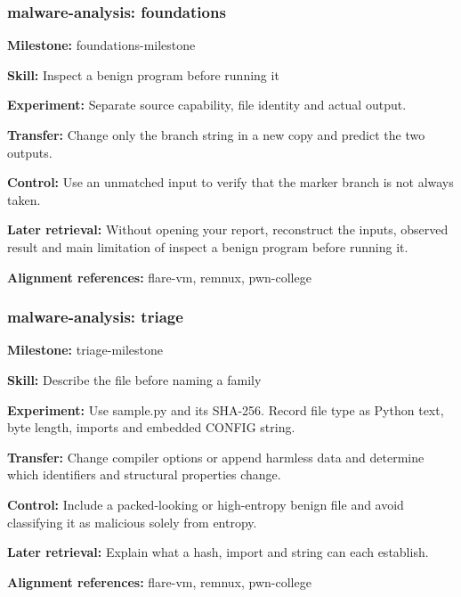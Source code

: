 \subsubsection{malware-analysis: foundations}
\noindent\textbf{Milestone:} foundations-milestone\par
\noindent\textbf{Skill:} Inspect a benign program before running it\par
\noindent\textbf{Experiment:} Separate source capability, file identity and actual output.\par
\noindent\textbf{Transfer:} Change only the branch string in a new copy and predict the two outputs.\par
\noindent\textbf{Control:} Use an unmatched input to verify that the marker branch is not always taken.\par
\noindent\textbf{Later retrieval:} Without opening your report, reconstruct the inputs, observed result and main limitation of inspect a benign program before running it.\par
\noindent\textbf{Alignment references:} flare-vm, remnux, pwn-college\par
\subsubsection{malware-analysis: triage}
\noindent\textbf{Milestone:} triage-milestone\par
\noindent\textbf{Skill:} Describe the file before naming a family\par
\noindent\textbf{Experiment:} Use sample.py and its SHA-256. Record file type as Python text, byte length, imports and embedded CONFIG string.\par
\noindent\textbf{Transfer:} Change compiler options or append harmless data and determine which identifiers and structural properties change.\par
\noindent\textbf{Control:} Include a packed-looking or high-entropy benign file and avoid classifying it as malicious solely from entropy.\par
\noindent\textbf{Later retrieval:} Explain what a hash, import and string can each establish.\par
\noindent\textbf{Alignment references:} flare-vm, remnux, pwn-college\par
